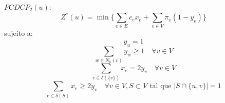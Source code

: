 \documentclass{article}
\begin{document}
	$PCDCP_2(u)$:
	\begin{equation}
		Z^*(u) = \min \Bigg\{ \sum_{e \in E} c_e x_e + \sum_{v \in V} \pi_v (1 - y_v) \Bigg\}
	\end{equation}
	sujeito a:
	\begin{equation}
		y_u = 1
	\end{equation}
	\begin{equation}
		\sum_{w \in N_k(v)} y_w \geq 1 \quad \forall v \in V
	\end{equation}
	\begin{equation}
		\sum_{e \in \delta(\{v\})} x_e = 2y_v \quad \forall v \in V
	\end{equation}
	\begin{equation}
		\sum_{e \in \delta(S)} x_e \geq 2y_v \quad \forall v \in V, S \subset V \text{ tal que } |S \cap \{u, v\}| = 1
	\end{equation}
\end{document}
